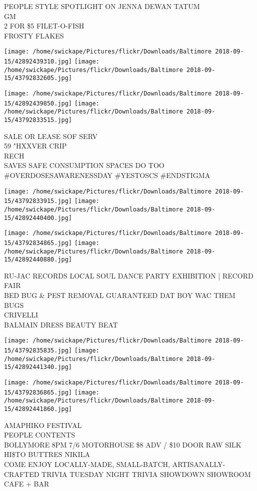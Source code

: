 \documentclass[10pt,letterpaper]{article}
\begin{document}
PEOPLE STYLE SPOTLIGHT ON JENNA DEWAN TATUM\\
GM\\
2 FOR \$5 FILET{-}O{-}FISH\\
FROSTY FLAKES
\pagebreak

\texttt{[image: /home/swickape/Pictures/flickr/Downloads/Baltimore 2018-09-15/42892439310.jpg]}
\texttt{[image: /home/swickape/Pictures/flickr/Downloads/Baltimore 2018-09-15/43792832605.jpg]}

\texttt{[image: /home/swickape/Pictures/flickr/Downloads/Baltimore 2018-09-15/42892439850.jpg]}
\texttt{[image: /home/swickape/Pictures/flickr/Downloads/Baltimore 2018-09-15/43792833515.jpg]}

SALE OR LEASE SOF SERV\\
59 "HXXVER CRIP\\
RECH\\
SAVES SAFE CONSUMPTION SPACES DO TOO \#OVERDOSESAWARENESSDAY \#YESTOSCS \#ENDSTIGMA
\pagebreak

\texttt{[image: /home/swickape/Pictures/flickr/Downloads/Baltimore 2018-09-15/43792833915.jpg]}
\texttt{[image: /home/swickape/Pictures/flickr/Downloads/Baltimore 2018-09-15/42892440400.jpg]}

\texttt{[image: /home/swickape/Pictures/flickr/Downloads/Baltimore 2018-09-15/43792834865.jpg]}
\texttt{[image: /home/swickape/Pictures/flickr/Downloads/Baltimore 2018-09-15/42892440880.jpg]}

RU{-}JAC RECORDS LOCAL SOUL DANCE PARTY EXHIBITION | RECORD FAIR\\
BED BUG \& PEST REMOVAL GUARANTEED DAT BOY WAC THEM BUGS\\
CRIVELLI\\
BALMAIN DRESS BEAUTY BEAT
\pagebreak

\texttt{[image: /home/swickape/Pictures/flickr/Downloads/Baltimore 2018-09-15/43792835835.jpg]}
\texttt{[image: /home/swickape/Pictures/flickr/Downloads/Baltimore 2018-09-15/42892441340.jpg]}

\texttt{[image: /home/swickape/Pictures/flickr/Downloads/Baltimore 2018-09-15/43792836865.jpg]}
\texttt{[image: /home/swickape/Pictures/flickr/Downloads/Baltimore 2018-09-15/42892441860.jpg]}

AMAPHIKO FESTIVAL\\
PEOPLE CONTENTS\\
BOLLYMORE 8PM 7/6 MOTORHOUSE \$8 ADV / \$10 DOOR RAW SILK HI\$TO BUTTRES NIKILA\\
COME ENJOY LOCALLY{-}MADE, SMALL{-}BATCH, ARTISANALLY{-}CRAFTED TRIVIA TUESDAY NIGHT TRIVIA SHOWDOWN SHOWROOM CAFE + BAR
\pagebreak
\end{document}

